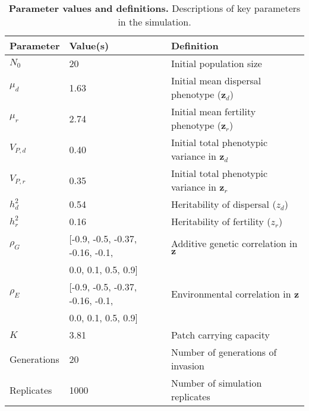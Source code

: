 {\renewcommand{\arraystretch}{1.4}%
\begin{table}[!p]
\centering
\label{Parameter values and definitions}
\caption[Parameter values and definitions]{\textbf{Parameter values and definitions.} Descriptions of key parameters in the simulation. }\label{corr:params}\vspace{0.1in}
\begin{tabularx}{0.95\linewidth}{llX}
\toprule
Parameter    & Value(s)                               & Definition                                        \\ \midrule
$N_{0}$      & 20                                     & Initial population size                           \\
$\mu_{d}$    & 1.63                                   & Initial mean dispersal phenotype ($\bm{z}_{d}$)   \\ 
$\mu_{r}$    & 2.74                                   & Initial mean fertility phenotype ($\bm{z}_{r}$) \\ 
$V_{P,d}$    & 0.40                                   & Initial total phenotypic variance in $\bm{z}_{d}$ \\ 
$V_{P,r}$    & 0.35                                   & Initial total phenotypic variance in $\bm{z}_{r}$ \\ 
$h^{2}_{d}$  & 0.54                                   & Heritability of dispersal ($z_d$)                 \\
$h^{2}_{r}$  & 0.16                                   & Heritability of fertility ($z_r$)               \\
$\rho_{G}$   & [-0.9, -0.5, -0.37, -0.16, -0.1,       & Additive genetic correlation in $\bm{z}$          \\
             & \phantom{$[-$}0.0, 0.1, 0.5, 0.9]      &                                                   \\
$\rho_{E}$   & [-0.9, -0.5, -0.37, -0.16, -0.1,       & Environmental correlation in $\bm{z}$             \\
             & \phantom{$[-$}0.0, 0.1, 0.5, 0.9]      &                                                   \\
$K$          & 3.81                                   & Patch carrying capacity                           \\
Generations  & 20                                     & Number of generations of invasion                 \\
Replicates   & 1000                                   & Number of simulation replicates                   \\ \bottomrule
\end{tabularx}
\end{table}}